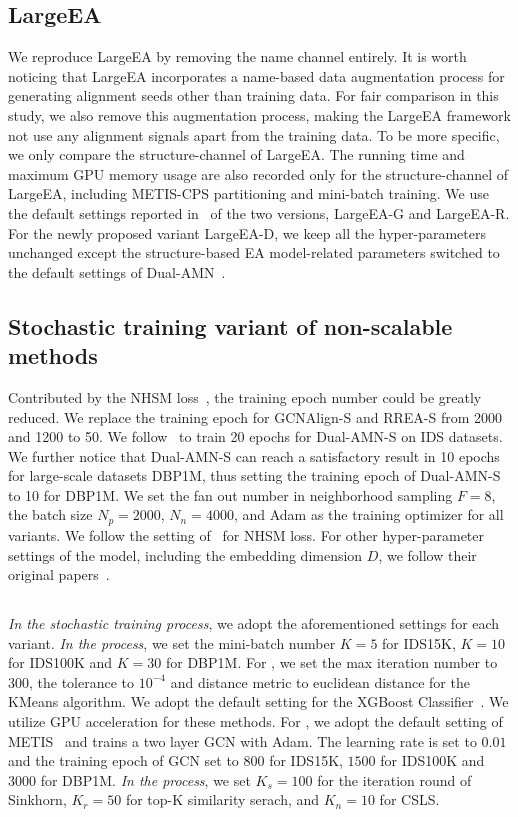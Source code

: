 \subsection{LargeEA} We reproduce LargeEA by removing the name channel entirely. It is worth noticing that LargeEA incorporates a name-based data augmentation process for generating alignment seeds other than training data. For fair comparison in this study, we also remove this augmentation process, making the LargeEA framework not use any alignment signals apart from the training data. To be more specific, we only compare the structure-channel of LargeEA. The running time and maximum GPU memory usage are also recorded only for the structure-channel of LargeEA, including METIS-CPS partitioning and mini-batch training. We use the default settings reported in~\cite{LargeEA22} of the two versions, LargeEA-G and LargeEA-R. For the newly proposed variant LargeEA-D, we keep all the hyper-parameters unchanged except the structure-based EA model-related parameters switched to the default settings of Dual-AMN~\cite{DualAMN21}. 

\subsection{Stochastic training variant of non-scalable methods} Contributed by the NHSM loss~\cite{DualAMN21}, the training epoch number could be greatly reduced. We replace the training epoch for GCNAlign-S and RREA-S from 2000 and 1200 to 50. We follow~\cite{DualAMN21} to train 20 epochs for Dual-AMN-S on IDS datasets. We further notice that Dual-AMN-S can reach a satisfactory result in 10 epochs for large-scale datasets DBP1M, thus setting the training epoch of Dual-AMN-S to 10 for DBP1M.
We set the fan out number in neighborhood sampling $F=8$, the batch size $N_p = 2000$, $N_n = 4000$, and Adam as the training optimizer for all variants. We follow the setting of~\cite{DualAMN21} for NHSM loss.
For other hyper-parameter settings of the model, including the embedding dimension $D$, we follow their original papers~\cite{GCN-Align18,RREA20, DualAMN21}.

\subsection{\ClusterEA{}}
\emph{In the stochastic training process}, we adopt the aforementioned settings for each \ClusterEA{} variant. \emph{In the \Sampling{} process}, we set the mini-batch number $K = 5$ for IDS15K, $K = 10$ for IDS100K and $K = 30$ for DBP1M. For \KMeans{}, we set the max iteration number to $300$, the tolerance to $10^{-4}$ and distance metric to euclidean distance for the KMeans algorithm. We adopt the default setting for the XGBoost Classifier~\cite{XGBoost16}. We utilize GPU acceleration for these methods. For \MetisGCN{}, we adopt the default setting of METIS~\cite{METIS98} and trains a two layer GCN with Adam. The learning rate is set to $0.01$ and the training epoch of GCN set to $800$ for IDS15K, $1500$ for IDS100K and $3000$ for DBP1M. \emph{In the \Merging{} process}, we set $K_s = 100$ for the iteration round of Sinkhorn, $K_r = 50$ for top-K similarity serach, and $K_n = 10$ for CSLS. 




